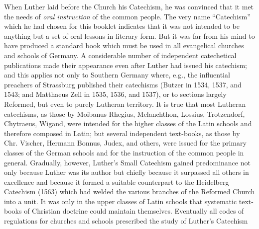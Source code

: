 When Luther laid before the Church his Catechism, he was convinced that it met the needs of \emph{oral instruction} of the common people. The very name “Catechism” which he had chosen for this booklet indicates that it was not intended to be anything but a set of oral lessons in literary form. But it was far from his mind to have produced a standard book which must be used in all evangelical churches and schools of Germany. A considerable number of independent catechetical publications made their appearance even after Luther had issued his catechism; and this applies not only to Southern Germany where, e.g., the influential preachers of Strassburg published their catechisms (Butzer in 1534, 1537, and 1543; and Matthaeus Zell in 1535, 1536, and 1537), or to sections largely Reformed, but even to purely Lutheran territory. It is true that most Lutheran catechisms, as those by Moibanus Rhegius, Melanchthon, Lossius, Trotzendorf, Chytraeus, Wigand, were intended for the higher classes of the Latin schools and therefore composed in Latin; but several independent text-books, as those by Chr. Vischer, Hermann Bonnus, Judex, and others, were issued for the primary classes of the German schools and for the instruction of the common people in general. Gradually, however, Luther’s Small Catechism gained predominance not only because Luther was its author but chiefly because it surpassed all others in excellence and because it formed a suitable counterpart to the Heidelberg Catechism (1563) which had welded the various branches of the Reformed Church into a unit. It was only in the upper classes of Latin schools that systematic text-books of Christian doctrine could maintain themselves. Eventually all codes of regulations for churches and schools prescribed the study of Luther’s Catechism
